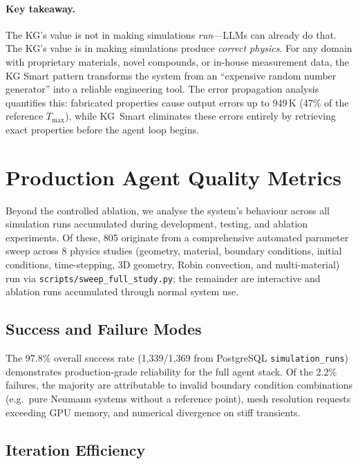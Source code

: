\documentclass[twocolumn]{article}
\begin{document}


\paragraph{Key takeaway.}
The KG's value is not in making simulations \emph{run}---LLMs can
already do that.  The KG's value is in making simulations produce
\emph{correct physics}.  For any domain with proprietary materials,
novel compounds, or in-house measurement data, the KG Smart pattern
transforms the system from an ``expensive random number generator''
into a reliable engineering tool.  The error propagation analysis
quantifies this: fabricated properties cause output errors up to
949\,K (47\% of the reference $T_{\max}$), while KG~Smart eliminates
these errors entirely by retrieving exact properties before the agent
loop begins.

\section{Production Agent Quality Metrics}
\label{sec:metrics}

Beyond the controlled ablation, we analyse the system's behaviour across all
simulation runs accumulated during development, testing, and ablation
experiments.  Of these, 805 originate from a comprehensive automated parameter sweep across 8 physics
studies (geometry, material, boundary conditions, initial conditions,
time-stepping, 3D geometry, Robin convection, and multi-material) run via
\texttt{scripts/sweep\_full\_study.py}; the remainder are interactive and
ablation runs accumulated through normal system use.



\subsection{Success and Failure Modes}

The 97.8\% overall success rate (1{,}339/1{,}369 from PostgreSQL
\texttt{simulation\_runs}) demonstrates production-grade reliability
for the full agent stack.  Of the 2.2\% failures, the majority are attributable to invalid boundary condition
combinations (e.g.\ pure Neumann systems without a reference point), mesh
resolution requests exceeding GPU memory, and numerical divergence on
stiff transients.

\subsection{Iteration Efficiency}
\end{document}
